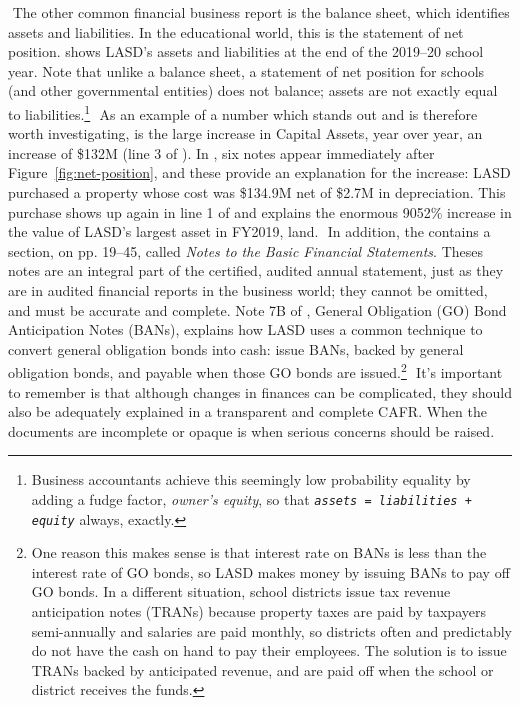     ﻿
    The other common financial business report is the balance sheet, which identifies assets and liabilities. In the educational world, this is the statement of net position.  shows LASD's assets and liabilities at the end of the 2019–20 school year. Note that unlike a balance sheet, a statement of net position for schools (and other governmental entities) does not balance; assets are not exactly equal to liabilities.\footnote{Business accountants achieve this seemingly low probability equality by adding a fudge factor, \textit{owner's equity}, so that \texttt{\textit{assets = liabilities + equity}} always, exactly.}
    ﻿
    As an example of a number which stands out and is therefore worth investigating, is the large increase in Capital Assets, year over year, an increase of \$132M (line 3 of ). In , six notes appear immediately after Figure~\ref{fig:net-position}, and these provide an explanation for the increase: LASD purchased a property whose cost was \$134.9M net of \$2.7M in depreciation. This purchase shows up again in line 1 of  and explains the enormous 9052\% increase in the value of LASD's largest asset in FY2019, land.
    ﻿
    In addition, the  contains a section, on pp. 19–45, called \textit{Notes to the Basic Financial Statements}. Theses notes are an integral part of the certified, audited annual statement, just as they are in audited financial reports in the business world; they cannot be omitted, and must be accurate and complete.  Note 7B of \textcite[7]{Kenyon2021}, General Obligation (GO) Bond Anticipation Notes (BANs), explains how LASD uses a common
    technique to convert general obligation bonds into cash: issue BANs, backed by general obligation bonds, and payable when those GO bonds are issued.\footnote{One reason this makes sense is that interest rate on BANs is less than the interest rate of GO bonds, so LASD makes money by issuing BANs to pay off GO bonds. In a different situation, school districts issue tax revenue anticipation notes (TRANs) because property taxes are paid by taxpayers semi-annually and salaries are paid monthly, so districts often and predictably do not have the cash on hand to pay their employees. The solution is to issue TRANs backed by anticipated revenue, and are paid off when the school or district receives the funds.}
    ﻿
    It's important to remember is that although changes in finances can be complicated, they should also be adequately explained in a transparent and complete CAFR\@. When the documents are incomplete or opaque is when serious concerns should be raised. %

